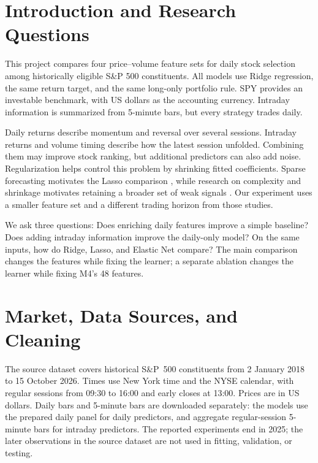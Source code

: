 \documentclass[11pt,a4paper]{article}
\begin{document}
\section{Introduction and Research Questions}
\label{sec:intro}
This project compares four price--volume feature sets for daily stock
selection among historically eligible S\&P 500 constituents. All models use
Ridge regression, the same return target, and the same long-only portfolio
rule. SPY provides an investable benchmark, with US dollars as the accounting
currency. Intraday information is summarized from 5-minute bars, but every
strategy trades daily.

Daily returns describe momentum and reversal over several sessions. Intraday
returns and volume timing describe how the latest session unfolded. Combining
them may improve stock ranking, but additional predictors can also add noise.
Regularization helps control this problem by shrinking fitted coefficients.
Sparse forecasting motivates the Lasso comparison \cite{chinco}, while
research on complexity and shrinkage motivates retaining a broader set of
weak signals \cite{kelly}. Our experiment uses a smaller feature set and a
different trading horizon from those studies.

We ask three questions: Does enriching daily features improve a simple
baseline? Does adding intraday information improve the daily-only model?
On the same inputs, how do Ridge, Lasso, and Elastic Net compare? The main
comparison changes the features while fixing the learner; a separate
ablation changes the learner while fixing M4's 48 features.

\section{Market, Data Sources, and Cleaning}
\label{sec:data}
The source dataset covers historical S\&P~500 constituents from 2 January 2018
to 15 October 2026. Times use New York time and the NYSE calendar, with regular
sessions from 09:30 to 16:00 and early closes at 13:00. Prices are in US dollars.
Daily bars and 5-minute bars are downloaded separately: the models use the
prepared daily panel for daily predictors, and aggregate regular-session
5-minute bars for intraday predictors. The reported experiments end in 2025;
the later observations in the source dataset are not used in fitting,
validation, or testing.
\end{document}
